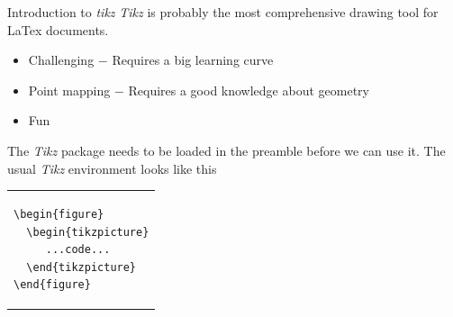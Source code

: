 \documentclass{beamer}\usepackage[]{graphicx}\usepackage[]{color}
\begin{document}
\begin{frame}[fragile]{Introduction to \emph{\textrm{tikz}}}
\textrm{\emph{Tikz}} is probably the most comprehensive drawing tool for LaTex documents. 
  \begin{itemize}
    \pause\item Challenging $-$ Requires a big learning curve
    \pause\item Point mapping $-$ Requires a good knowledge about geometry
    \pause\item Fun
  \end{itemize}
\pause
The \textrm{\emph{Tikz}} package needs to be loaded in the preamble before we can use it. The usual \textrm{\emph{Tikz}} environment looks like this

\begin{table}\small\vspace{-.25in}
\begin{tabular}{p{4cm}}
\begin{verbatim}
\begin{figure}
  \begin{tikzpicture}
     ...code...
  \end{tikzpicture}
\end{figure}
\end{verbatim}
\end{tabular}
\end{table}
\end{frame}
\end{document}
